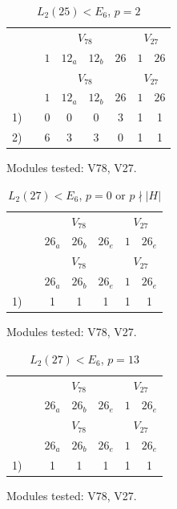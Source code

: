 \setcounter{table}{90}
\begin{longtable}{rc|cccc|cc}
\caption{$L_2(25) < E_6$, $p = 2$}\\
& & \multicolumn{4}{c|}{$V_{78}$} & \multicolumn{2}{c}{$V_{27}$} \\
& & $1$ & $12_{a}$ & $12_{b}$ & $26$ & $1$ & $26$ \\ \hline
\endfirsthead
& & \multicolumn{4}{c|}{$V_{78}$} & \multicolumn{2}{c}{$V_{27}$} \\
& & $1$ & $12_{a}$ & $12_{b}$ & $26$ & $1$ & $26$ \\ \hline
\endhead
1) &  & 0 & 0 & 0 & 3 & 1 & 1 \\
2) &  & 6 & 3 & 3 & 0 & 1 & 1 \\
\end{longtable}
\noindent Modules tested: V78, V27.\\

\setcounter{table}{91}
\begin{longtable}{rc|ccc|cc}
\caption{$L_2(27) < E_6$, $p = 0$ or $p \nmid |H|$}\\
& & \multicolumn{3}{c|}{$V_{78}$} & \multicolumn{2}{c}{$V_{27}$} \\
& & $26_{a}$ & $26_{b}$ & $26_{e}$ & $1$ & $26_{e}$ \\ \hline
\endfirsthead
& & \multicolumn{3}{c|}{$V_{78}$} & \multicolumn{2}{c}{$V_{27}$} \\
& & $26_{a}$ & $26_{b}$ & $26_{e}$ & $1$ & $26_{e}$ \\ \hline
\endhead
1) &  & 1 & 1 & 1 & 1 & 1 \\
\end{longtable}
\noindent Modules tested: V78, V27.\\

\setcounter{table}{92}
\begin{longtable}{rc|ccc|cc}
\caption{$L_2(27) < E_6$, $p = 13$}\\
& & \multicolumn{3}{c|}{$V_{78}$} & \multicolumn{2}{c}{$V_{27}$} \\
& & $26_{a}$ & $26_{b}$ & $26_{e}$ & $1$ & $26_{e}$ \\ \hline
\endfirsthead
& & \multicolumn{3}{c|}{$V_{78}$} & \multicolumn{2}{c}{$V_{27}$} \\
& & $26_{a}$ & $26_{b}$ & $26_{e}$ & $1$ & $26_{e}$ \\ \hline
\endhead
1) &  & 1 & 1 & 1 & 1 & 1 \\
\end{longtable}
\noindent Modules tested: V78, V27.\\

